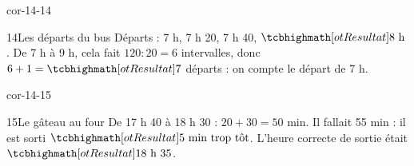 \begin{blocLivre}{cor-14-14}\begin{corrige}{14}{Les départs du bus}
Départs : 7 h, 7 h 20, 7 h 40, $\res{8\ \text h}$. De 7 h à 9 h, cela fait $120:20=6$ intervalles, donc $6+1=\res7$ départs : on compte le départ de 7 h.
\end{corrige}\end{blocLivre}
\begin{blocLivre}{cor-14-15}\begin{corrige}{15}{Le gâteau au four}
De 17 h 40 à 18 h 30 : $20+30=50$ min. Il fallait 55 min : il est sorti $\res{5\ \text{min trop tôt}}$. L’heure correcte de sortie était $\res{18\ \text h\ 35}$.
\end{corrige}\end{blocLivre}
